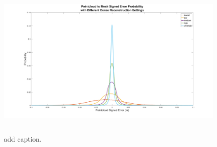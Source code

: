 \begin{figure}[H]
	\centering
	\includegraphics[height = 3in]{../fig/histerror}

	\caption{add caption.}
	\label{fig:hist}
\end{figure}